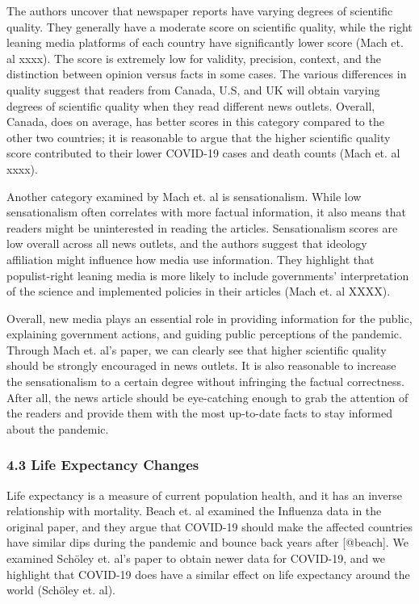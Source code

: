 \documentclass[
]{article}
\begin{document}
The authors uncover that newspaper reports have varying degrees of
scientific quality. They generally have a moderate score on scientific
quality, while the right leaning media platforms of each country have
significantly lower score (Mach et. al xxxx). The score is extremely low
for validity, precision, context, and the distinction between opinion
versus facts in some cases. The various differences in quality suggest
that readers from Canada, U.S, and UK will obtain varying degrees of
scientific quality when they read different news outlets. Overall,
Canada, does on average, has better scores in this category compared to
the other two countries; it is reasonable to argue that the higher
scientific quality score contributed to their lower COVID-19 cases and
death counts (Mach et. al xxxx).

Another category examined by Mach et. al is sensationalism. While low
sensationalism often correlates with more factual information, it also
means that readers might be uninterested in reading the articles.
Sensationalism scores are low overall across all news outlets, and the
authors suggest that ideology affiliation might influence how media use
information. They highlight that populist-right leaning media is more
likely to include governments' interpretation of the science and
implemented policies in their articles (Mach et. al XXXX).

Overall, new media plays an essential role in providing information for
the public, explaining government actions, and guiding public
perceptions of the pandemic. Through Mach et. al's paper, we can clearly
see that higher scientific quality should be strongly encouraged in news
outlets. It is also reasonable to increase the sensationalism to a
certain degree without infringing the factual correctness. After all,
the news article should be eye-catching enough to grab the attention of
the readers and provide them with the most up-to-date facts to stay
informed about the pandemic.

\hypertarget{life-expectancy-changes}{%
\subsubsection{4.3 Life Expectancy
Changes}\label{life-expectancy-changes}}

Life expectancy is a measure of current population health, and it has an
inverse relationship with mortality. Beach et. al examined the Influenza
data in the original paper, and they argue that COVID-19 should make the
affected countries have similar dips during the pandemic and bounce back
years after {[}@beach{]}. We examined Schöley et. al's paper to obtain
newer data for COVID-19, and we highlight that COVID-19 does have a
similar effect on life expectancy around the world (Schöley et. al).
\end{document}
